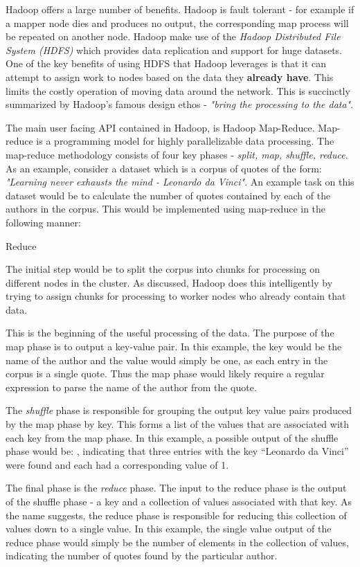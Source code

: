 Hadoop offers a large number of benefits. Hadoop is fault tolerant - for example if a mapper node dies and produces no output, the corresponding map process will be repeated on another node. Hadoop make use of the \textit{Hadoop Distributed File System (HDFS)} \cite{HDFS} which provides data replication and support for huge datasets. One of the key benefits of using HDFS that Hadoop leverages is that it can attempt to assign work to nodes based on the data they \textbf{already have}. This limits the costly operation of moving data around the network. This is succinctly summarized by Hadoop's famous design ethos - \textit{"bring the processing to the data"}.

The main user facing API contained in Hadoop, is Hadoop Map-Reduce. Map-reduce is a programming model for highly parallelizable data processing. The map-reduce methodology consists of four key phases - \textit{split, map, shuffle, reduce}. As an example, consider a dataset which is a corpus of quotes of the form:
\textit{"Learning never exhausts the mind - Leonardo da Vinci"}. An example task on this dataset would be to calculate the number of quotes contained by each of the authors in the corpus. This would be implemented using map-reduce in the following manner:

\begin{labeling}{Reduce }
	\item [Split] The initial step would be to split the corpus into chunks for processing on different nodes in the cluster. As discussed, Hadoop does this intelligently by trying to assign chunks for processing to worker nodes who already contain that data.
  \item [Map] This is the beginning of the useful processing of the data. The purpose of the map phase is to output a key-value pair. In this example, the key would be the name of the author and the value would simply be one, as each entry in the corpus is a single quote. Thus the map phase would likely require a regular expression to parse the name of the author from the quote.
  \item [Shuffle] The \textit{shuffle} phase is responsible for grouping the output key value pairs produced by the map phase by key. This forms a list of the values that are associated with each key from the map phase. In this example, a possible output of the shuffle phase would be: , indicating that three entries with the key ``Leonardo da Vinci'' were found and each had a corresponding value of 1. 
  \item [Reduce] The final phase is the \textit{reduce} phase. The input to the reduce phase is the output of the shuffle phase - a key and a collection of values associated with that key. As the name suggests, the reduce phase is responsible for reducing this collection of values down to a single value. In this example, the single value output of the reduce phase would simply be the number of elements in the collection of values, indicating the number of quotes found by the particular author.
\end{labeling}



